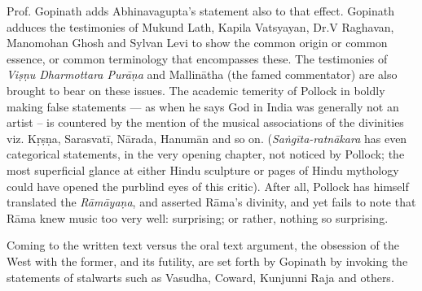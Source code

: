 Prof. Gopinath adds Abhinavagupta’s statement also to that effect. Gopinath adduces the testimonies of Mukund Lath, Kapila Vatsyayan, Dr.\@ V Raghavan, Manomohan Ghosh and Sylvan Levi to show the common origin or common essence, or common terminology that encompasses these. The testimonies of \textsl{Viṣṇu Dharmottara Purāṇa} and Mallinātha (the famed commentator) are also brought to bear on these issues. The academic temerity of Pollock in boldly making false statements --- as when he says God in India was generally not an artist -- is countered by the mention of the musical associations of the divinities viz. Kṛṣṇa, Sarasvatī, Nārada, Hanumān and so on. (\textsl{Saṅgīta-ratnākara} has even categorical statements, in the very opening chapter, not noticed by Pollock; the most superficial glance at either Hindu sculpture or pages of Hindu mythology could have opened the purblind eyes of this critic). After all, Pollock has himself translated the \textsl{Rāmāyaṇa}, and asserted Rāma’s divinity, and yet fails to note that Rāma knew music too very well: surprising; or rather, nothing so surprising.

Coming to the written text versus the oral text argument, the obsession of the West with the former, and its futility, are set forth by Gopinath by invoking the statements of stalwarts such as Vasudha, Coward, Kunjunni Raja and others.

